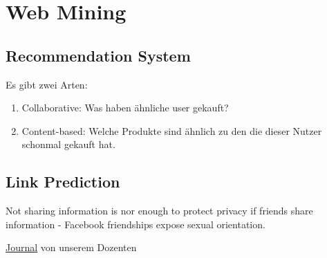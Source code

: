 \documentclass[a4paper]{article}
\title{\docTitle}
\author{Moritz}
\date{\today}
\begin{document}
\maketitle
\tableofcontents


\section{Web Mining}

\subsection{Recommendation System}

Es gibt zwei Arten:

\begin{enumerate}
    \item Collaborative: Was haben ähnliche user gekauft?
    \item Content-based: Welche Produkte sind ähnlich zu den die dieser Nutzer schonmal gekauft hat.
\end{enumerate}

\subsection{Link Prediction}

Not sharing information is nor enough to protect privacy if friends share information - Facebook friendships expose sexual orientation.

\href{https://journals.plos.org/plosone/article/file?id=10.1371/journal.pone.0034740&type=printable}{Journal} von unserem Dozenten
\end{document}
